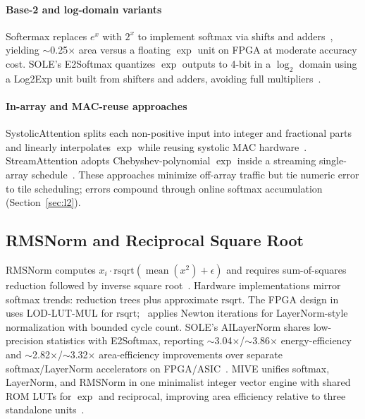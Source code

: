 \documentclass[conference]{IEEEtran}
\begin{document}
\paragraph{Base-2 and log-domain variants}
Softermax replaces $e^x$ with $2^x$ to implement softmax via shifts and adders~\cite{sun2022softmax}, yielding $\sim$0.25$\times$ area versus a floating $\exp$ unit on FPGA at moderate accuracy cost.
SOLE's E2Softmax quantizes $\exp$ outputs to 4-bit in a $\log_2$ domain using a Log2Exp unit built from shifters and adders, avoiding full multipliers~\cite{sole2025}.

\paragraph{In-array and MAC-reuse approaches}
SystolicAttention splits each non-positive input into integer and fractional parts and linearly interpolates $\exp$ while reusing systolic MAC hardware~\cite{lin2025systolicattention,koca2023exp}.
StreamAttention adopts Chebyshev-polynomial $\exp$ inside a streaming single-array schedule~\cite{streamattention2025}.
These approaches minimize off-array traffic but tie numeric error to tile scheduling; errors compound through online softmax accumulation (Section~\ref{sec:l2}).

\subsection{RMSNorm and Reciprocal Square Root}
\label{sec:l3-rmsnorm}

RMSNorm computes $x_i \cdot \mathrm{rsqrt}(\operatorname{mean}(x^2)+\epsilon)$ and requires sum-of-squares reduction followed by inverse square root~\cite{zhang2019root}.
Hardware implementations mirror softmax trends: reduction trees plus approximate $\mathrm{rsqrt}$.
The FPGA design in~\cite{softmaxrmsnorm2026} uses LOD-LUT-MUL for $\mathrm{rsqrt}$;~\cite{guaranteednorm2026} applies Newton iterations for LayerNorm-style normalization with bounded cycle count.
SOLE's AILayerNorm shares low-precision statistics with E2Softmax, reporting $\sim$3.04$\times$/$\sim$3.86$\times$ energy-efficiency and $\sim$2.82$\times$/$\sim$3.32$\times$ area-efficiency improvements over separate softmax/LayerNorm accelerators on FPGA/ASIC~\cite{sole2025}.
MIVE unifies softmax, LayerNorm, and RMSNorm in one minimalist integer vector engine with shared ROM LUTs for $\exp$ and reciprocal, improving area efficiency relative to three standalone units~\cite{mive2026}.
\end{document}
